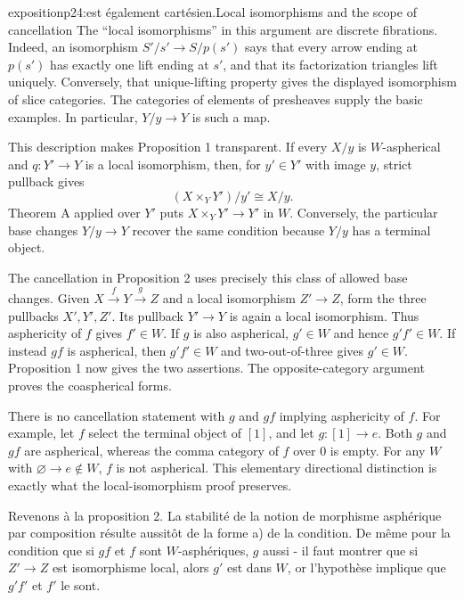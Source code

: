 \begin{dcomment}{exposition}{p24:est également cartésien.}{Local isomorphisms and the scope of cancellation}
The ``local isomorphisms'' in this argument are discrete fibrations. Indeed, an isomorphism $S'/s'\to S/p(s')$ says that every arrow ending at $p(s')$ has exactly one lift ending at $s'$, and that its factorization triangles lift uniquely. Conversely, that unique-lifting property gives the displayed isomorphism of slice categories. The categories of elements of presheaves supply the basic examples. In particular, $Y/y\to Y$ is such a map.

This description makes Proposition 1 transparent. If every $X/y$ is $W$-aspherical and $q:Y'\to Y$ is a local isomorphism, then, for $y'\in Y'$ with image $y$, strict pullback gives
\[
 (X\times_Y Y')/y'\cong X/y.
\]
Theorem A applied over $Y'$ puts $X\times_Y Y'\to Y'$ in $W$. Conversely, the particular base changes $Y/y\to Y$ recover the same condition because $Y/y$ has a terminal object.

The cancellation in Proposition 2 uses precisely this class of allowed base changes. Given $X\xrightarrow fY\xrightarrow gZ$ and a local isomorphism $Z'\to Z$, form the three pullbacks $X',Y',Z'$. Its pullback $Y'\to Y$ is again a local isomorphism. Thus asphericity of $f$ gives $f'\in W$. If $g$ is also aspherical, $g'\in W$ and hence $g'f'\in W$. If instead $gf$ is aspherical, then $g'f'\in W$ and two-out-of-three gives $g'\in W$. Proposition 1 now gives the two assertions. The opposite-category argument proves the coaspherical forms.

There is no cancellation statement with $g$ and $gf$ implying asphericity of $f$. For example, let $f$ select the terminal object of $[1]$, and let $g:[1]\to e$. Both $g$ and $gf$ are aspherical, whereas the comma category of $f$ over $0$ is empty. For any $W$ with $\varnothing\to e\notin W$, $f$ is not aspherical. This elementary directional distinction is exactly what the local-isomorphism proof preserves.
\end{dcomment}



Revenons à la proposition 2. La stabilité de la notion de morphisme asphérique par composition résulte aussitôt de la forme a) de la condition. De même pour la condition que si $gf$ et $f$ sont $W$-asphériques, $g$ aussi - il faut montrer que si $Z' \longrightarrow Z$ est isomorphisme local, alors $g'$ est dans $W$, or l'hypothèse implique que $g'f'$ et $f'$ le sont.

